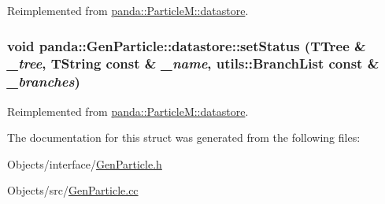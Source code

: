 Reimplemented from \hyperlink{structpanda_1_1ParticleM_1_1datastore_ab9f9e7afb145c12941baa10892ed1811}{panda::ParticleM::datastore}.\hypertarget{structpanda_1_1GenParticle_1_1datastore_ae4c5f9b8868d49879bba872aeb7b1027}{
\subsubsection[{setStatus}]{\setlength{\rightskip}{0pt plus 5cm}void panda::GenParticle::datastore::setStatus (TTree \& {\em \_\-tree}, \/  TString const \& {\em \_\-name}, \/  {\bf utils::BranchList} const \& {\em \_\-branches})}}
\label{structpanda_1_1GenParticle_1_1datastore_ae4c5f9b8868d49879bba872aeb7b1027}


Reimplemented from \hyperlink{structpanda_1_1ParticleM_1_1datastore_a0329bec2c84d16ff16e15824890e7a86}{panda::ParticleM::datastore}.

The documentation for this struct was generated from the following files:\begin{DoxyCompactItemize}
\item 
Objects/interface/\hyperlink{GenParticle_8h}{GenParticle.h}\item 
Objects/src/\hyperlink{GenParticle_8cc}{GenParticle.cc}\end{DoxyCompactItemize}
